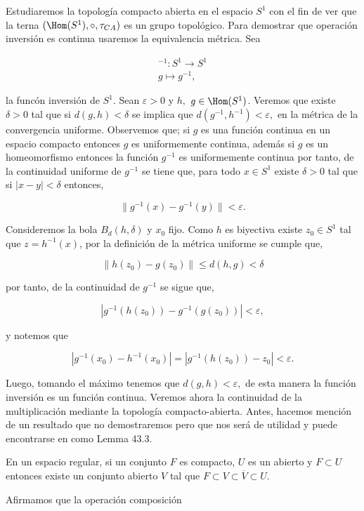  Estudiaremos la topología compacto abierta en el espacio $S^1$ con el fin de ver que la terna $(\Hom(S^1),\circ, \tau_{CA})$ es un grupo topológico. Para demostrar que operación inversión es continua usaremos la equivalencia métrica. Sea 
 
\begin{align*}
^{-1}:S^1 \to S^1 \\
g \mapsto g^{-1},
\end{align*} 

la funcón inversión de $S^1$. Sean $\varepsilon >0$ y  $h,$ $g \in \Hom(S^1)$. Veremos que existe $\delta >0$ tal que si $d(g,h) < \delta$  se implica que $d(g^{-1},h^{-1}) < \varepsilon,$ en la métrica de la convergencia uniforme. Observemos que; si $g$ es una función continua en un espacio compacto entonces $g$ es uniformemente continua, además si $g$ es un homeomorfismo entonces la función $g^{-1}$ es uniformemente continua por tanto, de la continuidad uniforme de $g^{-1}$ se tiene que, para todo $x \in S^1$ existe $\delta >0$ tal que si $|x-y|< \delta$ entonces,

$$\|g^{-1}(x)-g^{-1}(y)\| < \varepsilon.$$

Consideremos la bola $B_d(h,\delta)$ y $x_0$ fijo. Como $h$ es biyectiva existe $z_0 \in S^1$ tal que $z= h^{-1}(x)$, por la definición de la métrica uniforme se cumple que,

$$\|h(z_0)-g(z_0)\| \leq d(h,g) < \delta $$

por tanto, de la continuidad de $g^{-1}$ se sigue que,

$$|g^{-1}(h(z_0))-g^{-1}(g(z_0))| < \varepsilon,$$

y notemos que 

$$ |g^{-1}(x_0)-h^{-1}(x_0)|=|g^{-1}(h(z_0))-z_0| < \varepsilon. $$

Luego, tomando el máximo tenemos que $d(g,h) < \varepsilon,$ de esta manera la función inversión es un  función continua. Veremos ahora la continuidad de la multiplicación mediante la topología compacto-abierta. Antes, hacemos mención de un resultado que no demostraremos pero que nos será de utilidad y puede encontrarse en \cite{top_willd} como Lemma 43.3.

\begin{lm}
En un espacio regular, si un conjunto $F$ es compacto, $U$ es un abierto y $F \subset U$ entonces existe un conjunto abierto $V$ tal que $F \subset V \subset \overline{V} \subset U.$
\end{lm}

Afirmamos que la operación composición

